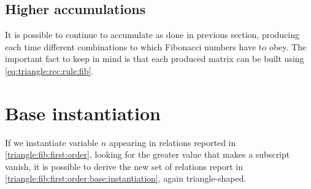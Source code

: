 \documentclass[a4paper,dottedtoc,headinclude,footinclude]{report} %
\theoremstyle{plain}
\begin{document}
    \subsection{Higher accumulations}
    
    It is possible to continue to accumulate as done in previous
    section, producing each time different combinations to which
    Fibonacci numbers have to obey. The important fact to keep in mind
    is that each produced matrix can be built using \autoref{eq:triangle:rec:rule:fib}.

    \section{Base instantiation}
    
    If we instantiate variable $n$ appearing in relations reported in
    \autoref{triangle:fib:first:order}, looking for the greater value
    that makes a subscript vanish, it is possible to derive the 
    new set of relations report in \autoref{triangle:fib:first:order:base:instantiation},
    again triangle-shaped.
\end{document}
